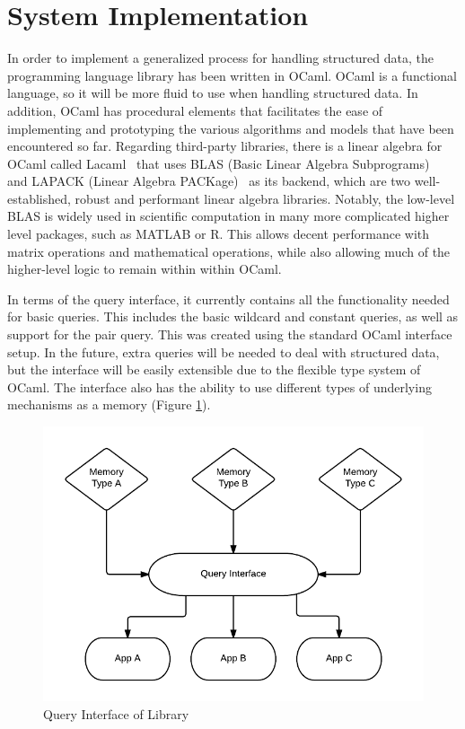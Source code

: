 \documentclass{sig-alternate}
\begin{document}
\section{System Implementation}
\label{sec:sysimp}

In order to implement a generalized process for handling structured data, the programming language 
library has been written in OCaml. OCaml is a functional language, so it will be more fluid to use 
when handling structured data. In addition, OCaml has procedural elements that facilitates the ease 
of implementing and prototyping the various algorithms and models that have been encountered so far. 
Regarding third-party libraries, there is a linear algebra for OCaml called Lacaml~\cite{lacaml} that uses BLAS 
(Basic Linear Algebra Subprograms)~\cite{blas}
and LAPACK (Linear Algebra PACKage)~\cite{lapack}
as its backend, which are two well-established, robust and performant linear algebra 
libraries. Notably, the low-level BLAS is widely used in scientific computation in many more complicated
higher level packages, such as MATLAB or R. This allows decent performance with matrix operations
and mathematical operations, while also allowing
much of the higher-level logic to remain within within OCaml.

In terms of the query interface, it currently contains all the functionality needed for basic
queries.  This includes the basic wildcard and constant queries, as well as support for the
pair query. This was created using the standard OCaml interface setup. In the
future, extra queries will be needed to deal with structured data, but the interface will be easily
extensible due to the flexible type system of OCaml. The interface also has the ability to use
different types of underlying mechanisms as a memory (Figure \ref{fig:queryint}).

\begin{figure}[h]
	\begin{center}
		\includegraphics[width=1\linewidth]{queryint}
	\end{center}
	\vspace{-12pt}
	\caption{Query Interface of Library}
	\label{fig:queryint}
\end{figure}
\end{document}
